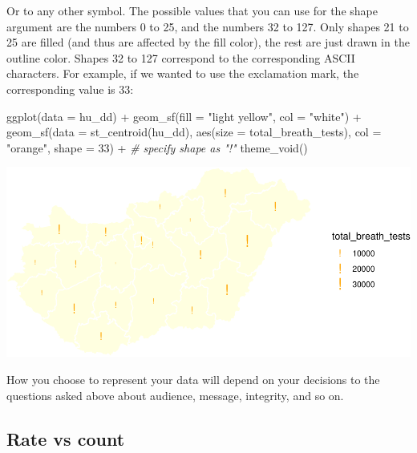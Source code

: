 \documentclass[
]{book}
\makeatletter
\newenvironment{Shaded}{\begin{snugshade}}{\end{snugshade}}
\newcommand{\AttributeTok}[1]{\textcolor[rgb]{0.61,0.61,0.61}{#1}}
\newcommand{\CommentTok}[1]{\textcolor[rgb]{0.37,0.37,0.37}{\textit{#1}}}
\newcommand{\DecValTok}[1]{\textcolor[rgb]{0.06,0.06,0.06}{#1}}
\newcommand{\FunctionTok}[1]{\textcolor[rgb]{0,0,0}{#1}}
\newcommand{\NormalTok}[1]{#1}
\newcommand{\SpecialCharTok}[1]{\textcolor[rgb]{0,0,0}{#1}}
\newcommand{\StringTok}[1]{\textcolor[rgb]{0.5,0.5,0.5}{#1}}
\newenvironment{kframe}{%
\medskip{}
\setlength{\fboxsep}{.8em}
 \def\at@end@of@kframe{}%
 \ifinner\ifhmode%
  \def\at@end@of@kframe{\end{minipage}}%
  \begin{minipage}{\columnwidth}%
 \fi\fi%
 \def\FrameCommand##1{\hskip\@totalleftmargin \hskip-\fboxsep
 \colorbox{shadecolor}{##1}\hskip-\fboxsep
     \hskip-\linewidth \hskip-\@totalleftmargin \hskip\columnwidth}%
 \MakeFramed {\advance\hsize-\width
   \@totalleftmargin\z@ \linewidth\hsize
   \@setminipage}}%
 {\par\unskip\endMakeFramed%
 \at@end@of@kframe}
\renewenvironment{Shaded}{\begin{kframe}}{\end{kframe}}
\makeatother
\begin{document}
Or to any other symbol. The possible values that you can use for the shape argument are the numbers 0 to 25, and the numbers 32 to 127. Only shapes 21 to 25 are filled (and thus are affected by the fill color), the rest are just drawn in the outline color. Shapes 32 to 127 correspond to the corresponding ASCII characters. For example, if we wanted to use the exclamation mark, the corresponding value is 33:

\begin{Shaded}
\begin{Highlighting}[]
\FunctionTok{ggplot}\NormalTok{(}\AttributeTok{data =}\NormalTok{ hu\_dd) }\SpecialCharTok{+} 
  \FunctionTok{geom\_sf}\NormalTok{(}\AttributeTok{fill =} \StringTok{"light yellow"}\NormalTok{, }
          \AttributeTok{col =} \StringTok{"white"}\NormalTok{) }\SpecialCharTok{+} 
  \FunctionTok{geom\_sf}\NormalTok{(}\AttributeTok{data =} \FunctionTok{st\_centroid}\NormalTok{(hu\_dd), }
          \FunctionTok{aes}\NormalTok{(}\AttributeTok{size =}\NormalTok{ total\_breath\_tests), }
          \AttributeTok{col =} \StringTok{"orange"}\NormalTok{, }
          \AttributeTok{shape =} \DecValTok{33}\NormalTok{) }\SpecialCharTok{+} \CommentTok{\# specify shape as "!"}
  \FunctionTok{theme\_void}\NormalTok{()}
\end{Highlighting}
\end{Shaded}

\includegraphics{crime_mapping_files/figure-latex/gradsymbmapcoldiamond-1.pdf}

How you choose to represent your data will depend on your decisions to the questions asked above about audience, message, integrity, and so on.

\hypertarget{rate-vs-count}{%
\subsection{Rate vs count}\label{rate-vs-count}}
\end{document}

